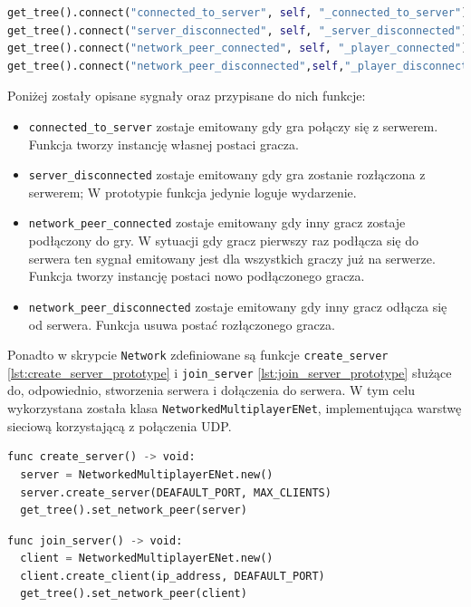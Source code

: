 \begin{lstlisting}[language=python,caption=Podłączanie do najważniejszych sygnałów sieciowych, label=lst:signal_connecting_prototype ,basicstyle=\footnotesize\ttfamily]
get_tree().connect("connected_to_server", self, "_connected_to_server")
get_tree().connect("server_disconnected", self, "_server_disconnected")
get_tree().connect("network_peer_connected", self, "_player_connected")
get_tree().connect("network_peer_disconnected",self,"_player_disconnected")
\end{lstlisting}

Poniżej zostały opisane sygnały oraz przypisane do nich funkcje:
\begin{itemize}
    \item \texttt{connected\_to\_server} zostaje emitowany gdy gra połączy się z serwerem. Funkcja tworzy instancję własnej postaci gracza.
    \item \texttt{server\_disconnected} zostaje emitowany gdy gra zostanie rozłączona z serwerem; W prototypie funkcja jedynie loguje wydarzenie.
    \item \texttt{network\_peer\_connected} zostaje emitowany gdy inny gracz zostaje podłączony do gry. W sytuacji gdy gracz pierwszy raz podłącza się do serwera ten sygnał emitowany jest dla wszystkich graczy już na serwerze. Funkcja tworzy instancję postaci nowo podłączonego gracza.
    \item \texttt{network\_peer\_disconnected} zostaje emitowany gdy inny gracz odłącza się od serwera. Funkcja usuwa postać rozłączonego gracza.
\end{itemize}

Ponadto w skrypcie \texttt{Network} zdefiniowane są funkcje \texttt{create\_server} \ref{lst:create_server_prototype} i \texttt{join\_server} \ref{lst:join_server_prototype} służące do, odpowiednio, stworzenia serwera i dołączenia do serwera. W tym celu wykorzystana została klasa \texttt{NetworkedMultiplayerENet}, implementująca warstwę sieciową korzystającą z połączenia UDP.


\begin{lstlisting}[language=python,caption=Funkcja inicjująca serwer gry., label=lst:create_server_prototype,basicstyle=\footnotesize\ttfamily]
func create_server() -> void:
  server = NetworkedMultiplayerENet.new()
  server.create_server(DEAFAULT_PORT, MAX_CLIENTS)
  get_tree().set_network_peer(server)
\end{lstlisting}
\begin{lstlisting}[language=python,caption=Funkcja łącząca do serwera gry., label=lst:join_server_prototype,basicstyle=\footnotesize\ttfamily]
func join_server() -> void:
  client = NetworkedMultiplayerENet.new()
  client.create_client(ip_address, DEAFAULT_PORT)
  get_tree().set_network_peer(client)
\end{lstlisting}

